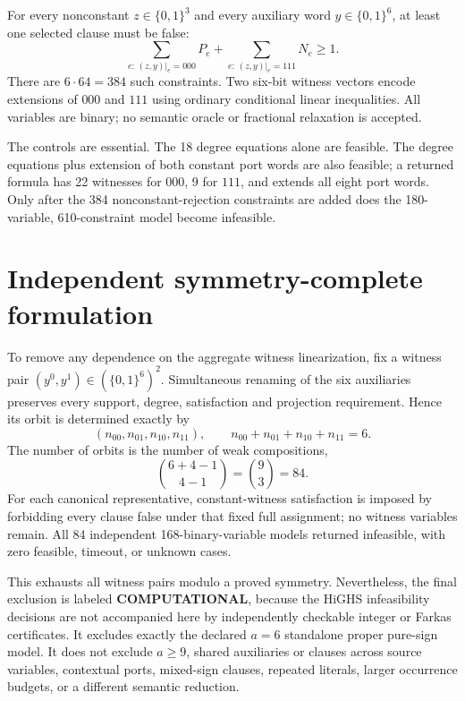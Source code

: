\documentclass[11pt]{article}
\begin{document}
For every nonconstant $z\in\{0,1\}^3$ and every auxiliary word $y\in\{0,1\}^6$, at least one selected clause must be false:
\[
 \sum_{e:\,(z,y)|_e=000}P_e+
 \sum_{e:\,(z,y)|_e=111}N_e\ge1.
\]
There are $6\cdot64=384$ such constraints.  Two six-bit witness vectors encode extensions of $000$ and $111$ using ordinary conditional linear inequalities.  All variables are binary; no semantic oracle or fractional relaxation is accepted.

The controls are essential.  The 18 degree equations alone are feasible.  The degree equations plus extension of both constant port words are also feasible; a returned formula has 22 witnesses for $000$, 9 for $111$, and extends all eight port words.  Only after the 384 nonconstant-rejection constraints are added does the 180-variable, 610-constraint model become infeasible.

\section{Independent symmetry-complete formulation}
To remove any dependence on the aggregate witness linearization, fix a witness pair $(y^0,y^1)\in(\{0,1\}^6)^2$.  Simultaneous renaming of the six auxiliaries preserves every support, degree, satisfaction and projection requirement.  Hence its orbit is determined exactly by
\[
 (n_{00},n_{01},n_{10},n_{11}),\qquad
 n_{00}+n_{01}+n_{10}+n_{11}=6.
\]
The number of orbits is the number of weak compositions,
\[
 \binom{6+4-1}{4-1}=\binom93=84.
\]
For each canonical representative, constant-witness satisfaction is imposed by forbidding every clause false under that fixed full assignment; no witness variables remain.  All 84 independent 168-binary-variable models returned infeasible, with zero feasible, timeout, or unknown cases.

This exhausts all witness pairs modulo a proved symmetry.  Nevertheless, the final exclusion is labeled \textbf{COMPUTATIONAL}, because the HiGHS infeasibility decisions are not accompanied here by independently checkable integer or Farkas certificates.  It excludes exactly the declared $a=6$ standalone proper pure-sign model.  It does not exclude $a\ge9$, shared auxiliaries or clauses across source variables, contextual ports, mixed-sign clauses, repeated literals, larger occurrence budgets, or a different semantic reduction.
\end{document}

